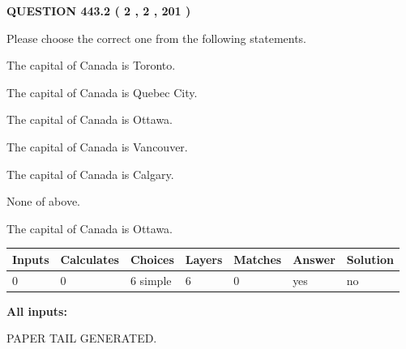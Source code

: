 \documentclass[12pt]{article}
\begin{document}
\vspace{0.2in}
  
{\textbf{\Large{QUESTION
443.2 
 ( 2 , 2 , 201 )
}}}
  
  
Please choose the correct one from the following statements.
 
 
The capital of Canada is Toronto.
 
 
The capital of Canada is Quebec City.
 
 
The capital of Canada is Ottawa.
 
 
The capital of Canada is Vancouver.
 
 
The capital of Canada is Calgary.
 
 
 None of above.
 
 
\noindent{}
 
 
The capital of Canada is Ottawa.
 
 
\noindent{}
 
 
   
   
   
   
\noindent\begin{tabular}{|l|l|l|l|l|l|l|}
 \hline
Inputs & Calculates & Choices & Layers & Matches & Answer & Solution \\ \hline
 0  & 
 0  & 
 6
  simple  
  & 
 6  & 
 0  & 
  yes & 
  no 
  \\ \hline
 \end{tabular}
   
   
   
   
\noindent{}
   
   
   
   
\noindent\vspace{0.1in}\hspace{-0.08in} {\textbf{\Large{All inputs: }}}
   
   
   
   
   
   
 \vspace{0.2in}
 
   
   
\vspace{2.0in} PAPER TAIL GENERATED.
   
\end{document}
